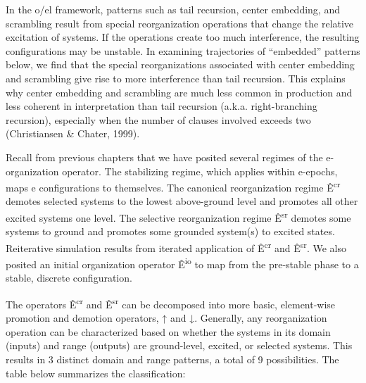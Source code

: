   In the o/el framework, patterns such as tail recursion, center embedding, and scrambling result from special reorganization operations that change the relative excitation of systems. If the operations create too much interference, the resulting configurations may be unstable. In examining trajectories of “embedded” patterns below, we find that the special reorganizations associated with center embedding and scrambling give rise to more interference than tail recursion. This explains why center embedding and scrambling are much less common in production and less coherent in interpretation than tail recursion (a.k.a. right-branching recursion), especially when the number of clauses involved exceeds two (Christiansen \& Chater, 1999). 

  Recall from previous chapters that we have posited several regimes of the e-organization operator. The stabilizing regime, which applies within e-epochs, maps e configurations to themselves. The canonical reorganization regime Ê\textsuperscript{cr} demotes selected systems to the lowest above-ground level and promotes all other excited systems one level. The selective reorganization regime Ê\textsuperscript{sr} demotes some systems to ground and promotes some grounded system(s) to excited states. Reiterative simulation results from iterated application of Ê\textsuperscript{cr} and Ê\textsuperscript{sr}. We also posited an initial organization operator Ê\textsuperscript{io} to map from the pre-stable phase to a stable, discrete configuration.

  The operators Ê\textsuperscript{cr} and Ê\textsuperscript{sr} can be decomposed into more basic, element-wise promotion and demotion operators, ↑ and ↓. Generally, any reorganization operation can be characterized based on whether the systems in its domain (inputs) and range (outputs) are ground-level, excited, or selected systems. This results in 3 distinct domain and range patterns, a total of 9 possibilities. The table below summarizes the classification:

